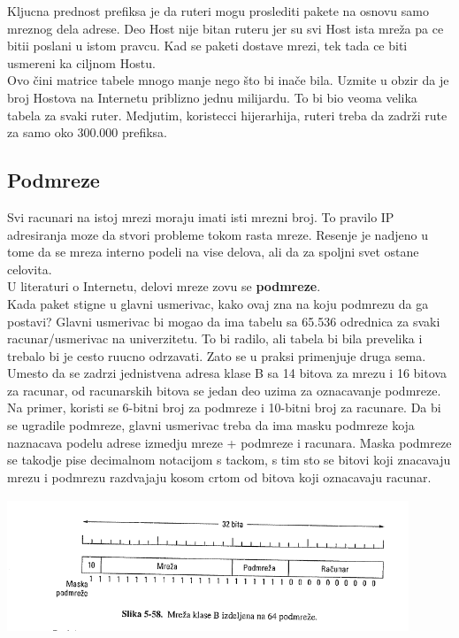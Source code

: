 \documentclass{article} %
\begin{document}
Kljucna prednost prefiksa je da ruteri mogu proslediti pakete na osnovu samo
mreznog dela adrese. Deo Host nije bitan ruteru jer su svi Host ista mreža pa  ce bitii poslani u istom pravcu. Kad se paketi dostave mrezi, tek tada ce biti usmereni ka ciljnom Hostu.\\

Ovo čini matrice tabele mnogo manje nego što bi inače
bila.  Uzmite u obzir da je broj Hostova na Internetu priblizno jednu milijardu.
To bi bio veoma velika tabela za svaki ruter. Medjutim, koristecci
hijerarhija, ruteri treba da zadrži rute za samo oko 300.000 prefiksa.
\subsection{Podmreze}
Svi racunari na istoj mrezi moraju imati isti mrezni broj. To pravilo IP adresiranja moze da stvori probleme tokom rasta mreze. Resenje je nadjeno u tome da se mreza interno podeli na vise delova, ali da za spoljni svet ostane celovita.\\
 
U literaturi o Internetu, delovi mreze zovu se \textbf{podmreze}.\\

Kada paket stigne u glavni usmerivac, kako ovaj zna na koju podmrezu da ga postavi? Glavni usmerivac bi mogao da ima tabelu sa 65.536 odrednica za svaki racunar/usmerivac na univerzitetu. To bi radilo, ali tabela bi bila prevelika i trebalo bi je cesto ruucno odrzavati. Zato se u praksi primenjuje druga sema. Umesto da se zadrzi jednistvena adresa klase B sa 14 bitova za mrezu i 16 bitova za racunar, od racunarskih bitova se jedan deo uzima za oznacavanje podmreze. Na primer, koristi se 6-bitni broj za podmreze i 10-bitni broj za racunare. Da bi se ugradile podmreze, glavni usmerivac treba da ima masku podmreze koja naznacava podelu adrese izmedju mreze + podmreze i racunara. Maska podmreze se takodje pise decimalnom notacijom s tackom, s tim sto se bitovi koji znacavaju mrezu i podmrezu razdvajaju kosom crtom od bitova koji oznacavaju racunar. 
 \begin{center}
\includegraphics[width=12cm, height=4cm]{maskaPodmreze}\\
\end{center}
\end{document}
